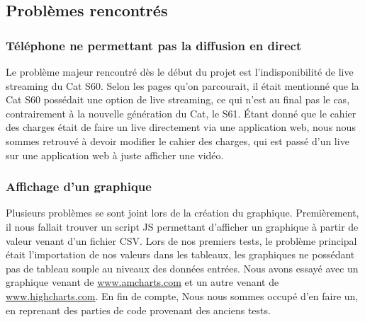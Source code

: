 \documentclass[12pt]{article}
\begin{document}
\subsection{Problèmes rencontrés}
\subsubsection{Téléphone ne permettant pas la diffusion en direct}
Le problème majeur rencontré dès le début du projet est l’indisponibilité de live streaming du Cat S60. Selon les pages qu’on parcourait, il était mentionné que la Cat S60 possédait une option de live streaming, ce qui n’est au final pas le cas, contrairement à la nouvelle génération du Cat, le S61. Étant donné que le cahier des charges était de faire un live directement via une application web, nous nous sommes retrouvé à devoir modifier le cahier des charges, qui est passé d’un live sur une application web à juste afficher une vidéo.
\subsubsection{Affichage d'un graphique}
Plusieurs problèmes se sont joint lors de la création du graphique. Premièrement, il nous fallait trouver un script JS permettant d’afficher un graphique à partir de valeur venant d’un fichier CSV. Lors de nos premiers tests, le problème principal était l’importation de nos valeurs dans les tableaux, les graphiques ne possédant pas de tableau souple au niveaux des données entrées. Nous avons essayé avec un graphique venant de \url{www.amcharts.com} et un autre venant de \url{www.highcharts.com}. En fin de compte, Nous nous sommes occupé d’en faire un, en reprenant des parties de code provenant des anciens tests. 

\clearpage
\end{document}
